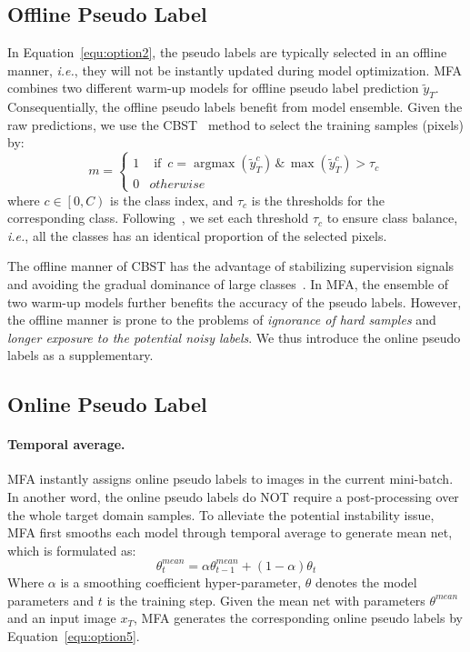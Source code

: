 \documentclass{bmvc2k}
\begin{document}
\subsection{Offline Pseudo Label}\label{sec: offline}
In Equation~\ref{equ:option2}, the pseudo labels are typically selected in an offline manner, \emph{i.e.}, they will not be instantly updated during model optimization. 
MFA combines two different warm-up models for offline pseudo label prediction $\tilde{y}_{T}$. Consequentially, the offline pseudo labels benefit from model ensemble. Given the raw predictions, we use the CBST~\cite{RN162} method to select the training samples (pixels) by:\begin{equation}
\label{equ:option7}
m = 
\begin{cases}
1  & \text{ if }\, c=\mathop{\arg\max}\left ( \tilde{y}_{T}^{c} \right )\, \& \, \mathop{\max}\left(\tilde{y}_{T}^{c}\right)>\tau_{c} \\
0 & otherwise
\end{cases}
\end{equation}where $c\in \left [ 0, C\right )$ is the class index, and $\tau_{c}$ is the thresholds for the corresponding class. Following~\cite{RN162}, we set each threshold $\tau_{c}$ to ensure class balance, \emph{i.e.}, all the classes has an identical proportion of the selected pixels.

The offline manner of CBST has the advantage of stabilizing supervision signals and avoiding the gradual dominance of large classes~\cite{RN162}. In MFA, the ensemble of two warm-up models further benefits the accuracy of the pseudo labels. However, the offline manner is prone to the problems of \emph{ignorance of hard samples} \cite{RN204} and \emph{longer exposure to the potential noisy labels}. We thus introduce the online pseudo labels as a supplementary.

\subsection{Online Pseudo Label} \label{sec: online}
\paragraph{Temporal average.} MFA instantly assigns online pseudo labels to images in the current mini-batch. In another word, the online pseudo labels do NOT require a post-processing over the whole target domain samples. To alleviate the potential instability issue, MFA first smooths each model through temporal average to generate mean net, which is formulated as:
\begin{equation}
\label{equ:option3}
\theta_{t}^{mean} = \alpha \theta_{t-1}^{mean}+(1-\alpha)\theta_{t}
\end{equation}Where $\alpha$ is a smoothing coefficient hyper-parameter, $\theta$ denotes the model parameters and $t$ is the training step. Given the mean net with parameters $\theta^{mean}$ and an input image $x_T$, MFA generates the corresponding online pseudo labels by Equation~\ref{equ:option5}.
\end{document}
